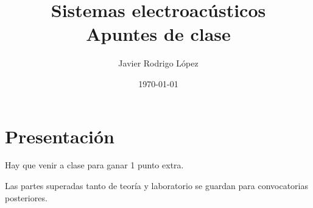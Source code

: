 \documentclass[10pt]{book}
\title{\Huge Sistemas electroacústicos\\\huge Apuntes de clase}
\author{Javier Rodrigo López}
\date{\today}
\begin{document}
\maketitle

\tableofcontents



\newpage

\section*{Presentación}

Hay que venir a clase para ganar 1 punto extra.

Las partes superadas tanto de teoría y laboratorio se guardan para convocatorias posteriores.

\newpage




\end{document}
